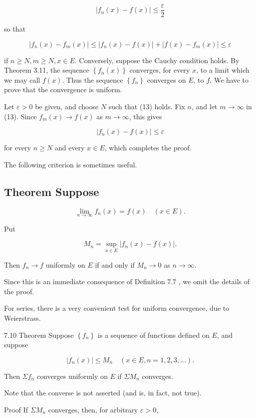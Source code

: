 \documentclass[10pt]{article}
\begin{document}
$$
\left|f_{n}(x)-f(x)\right| \leq \frac{\varepsilon}{2}
$$

so that

$$
\left|f_{n}(x)-f_{m}(x)\right| \leq\left|f_{n}(x)-f(x)\right|+\left|f(x)-f_{m}(x)\right| \leq \varepsilon
$$

if $n \geq N, m \geq N, x \in E$. Conversely, suppose the Cauchy condition holds. By Theorem 3.11, the sequence $\left\{f_{n}(x)\right\}$ converges, for every $x$, to a limit which we may call $f(x)$. Thus the sequence $\left\{f_{n}\right\}$ converges on $E$, to $f$. We have to prove that the convergence is uniform.

Let $\varepsilon>0$ be given, and choose $N$ such that (13) holds. Fix $n$, and let $m \rightarrow \infty$ in (13). Since $f_{m}(x) \rightarrow f(x)$ as $m \rightarrow \infty$, this gives

$$
\left|f_{n}(x)-f(x)\right| \leq \varepsilon
$$

for every $n \geq N$ and every $x \in E$, which completes the proof.

The following criterion is sometimes useful.

\subsection{Theorem Suppose}
$$
\lim _{n \rightarrow \infty} f_{n}(x)=f(x) \quad(x \in E) .
$$

Put

$$
M_{n}=\sup _{x \in E}\left|f_{n}(x)-f(x)\right| .
$$

Then $f_{n} \rightarrow f$ uniformly on $E$ if and only if $M_{n} \rightarrow 0$ as $n \rightarrow \infty$.

Since this is an immediate consequence of Definition 7.7 , we omit the details of the proof.

For series, there is a very convenient test for uniform convergence, due to Weierstrass.

7.10 Theorem Suppose $\left\{f_{n}\right\}$ is a sequence of functions defined on $E$, and suppose

$$
\left|f_{n}(x)\right| \leq M_{n} \quad(x \in E, n=1,2,3, \ldots) .
$$

Then $\Sigma f_{n}$ converges uniformly on $E$ if $\Sigma M_{n}$ converges.

Note that the converse is not asserted (and is, in fact, not true).

Proof If $\Sigma M_{n}$ converges, then, for arbitrary $\varepsilon>0$,
\end{document}
